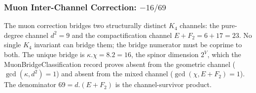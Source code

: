 \documentclass[11pt,a4paper]{book}
\def\cdot{.}%
\def\texttt#1{#1}%
\begin{document}
\begin{code}
\>[0]\<%
\\
\>[0]\AgdaSpace{}%
\AgdaSymbol{:}\AgdaSpace{}%
\AgdaSpace{}%
\AgdaSpace{}%
\AgdaSpace{}%
\AgdaOperator{\AgdaPrimitive{*}}\AgdaSpace{}%
\<%
\\
\>[0]\AgdaSpace{}%
\AgdaSymbol{=}\AgdaSpace{}%
\<%
\\
%
\\[\AgdaEmptyExtraSkip]%
\>[0]\<%
\\
\>[0]\AgdaSpace{}%
\AgdaSymbol{:}\AgdaSpace{}%
\AgdaSpace{}%
\AgdaSpace{}%
\<%
\\
\>[0]\AgdaSpace{}%
\AgdaSymbol{=}\AgdaSpace{}%
\<%
\\
%
\\[\AgdaEmptyExtraSkip]%
\>[0]\<%
\\
\>[0]\AgdaSpace{}%
\AgdaSymbol{:}\AgdaSpace{}%
\AgdaSpace{}%
\AgdaSpace{}%
\<%
\\
\>[0]\AgdaSpace{}%
\AgdaSymbol{=}\AgdaSpace{}%
\<%
\end{code}

\subsubsection*{Muon Inter-Channel Correction: $-16/69$}

The muon correction bridges two structurally distinct $K_4$ channels: the pure-degree
channel $d^2 = 9$ and the compactification channel $E + F_2 = 6 + 17 = 23$.  No single
$K_4$ invariant can bridge them; the bridge numerator must be coprime to both.  The
unique bridge is $\kappa \cdot \chi = 8 \cdot 2 = 16$, the spinor dimension $2^V$,
which the \texttt{MuonBridgeClassification} record proves absent from the geometric
channel ($\gcd(\kappa, d^2) = 1$) and absent from the mixed channel
($\gcd(\chi, E + F_2) = 1$).  The denominator $69 = d \cdot (E + F_2)$ is the
channel-survivor product.
\end{document}
